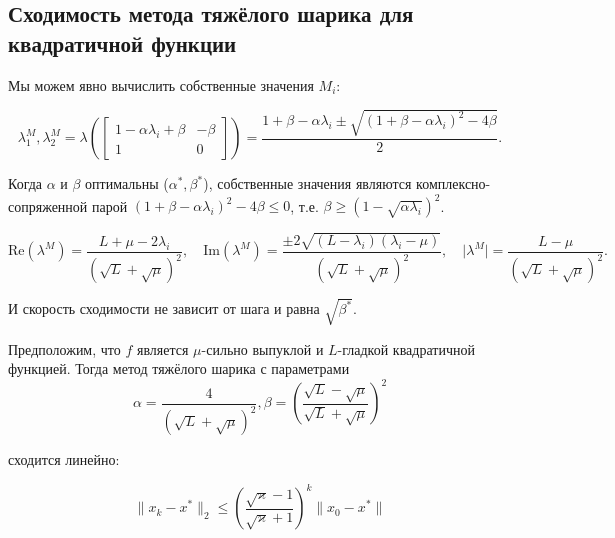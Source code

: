 \documentclass[
  russian,
  letterpaper,
  DIV=11,
  numbers=noendperiod]{scrartcl}
\begin{document}
\subsection{Сходимость метода тяжёлого шарика для квадратичной
функции}\label{ux441ux445ux43eux434ux438ux43cux43eux441ux442ux44c-ux43cux435ux442ux43eux434ux430-ux442ux44fux436ux451ux43bux43eux433ux43e-ux448ux430ux440ux438ux43aux430-ux434ux43bux44f-ux43aux432ux430ux434ux440ux430ux442ux438ux447ux43dux43eux439-ux444ux443ux43dux43aux446ux438ux438}

Мы можем явно вычислить собственные значения \(M_i\):

\[
\lambda^M_1, \lambda^M_2 = \lambda \left( \begin{bmatrix} 
1 - \alpha \lambda_i + \beta & -\beta \\
1 & 0
\end{bmatrix}\right) = \dfrac{1+\beta - \alpha \lambda_i \pm \sqrt{(1+\beta - \alpha\lambda_i)^2 - 4\beta}}{2}.
\]

Когда \(\alpha\) и \(\beta\) оптимальны (\(\alpha^*, \beta^*\)),
собственные значения являются комплексно-сопряженной парой
\((1+\beta - \alpha\lambda_i)^2 - 4\beta \leq 0\), т.е.
\(\beta \geq (1 - \sqrt{\alpha \lambda_i})^2\).

\[
\text{Re}(\lambda^M) = \dfrac{L + \mu - 2\lambda_i}{(\sqrt{L} + \sqrt{\mu})^2}, \quad \text{Im}(\lambda^M) = \dfrac{\pm 2\sqrt{(L - \lambda_i)(\lambda_i - \mu)}}{(\sqrt{L} + \sqrt{\mu})^2}, \quad \lvert \lambda^M \rvert = \dfrac{L - \mu}{(\sqrt{L} + \sqrt{\mu})^2}.
\]

И скорость сходимости не зависит от шага и равна \(\sqrt{\beta^*}\).

\begin{tcolorbox}[enhanced jigsaw, rightrule=.15mm, coltitle=black, title=\textcolor{quarto-callout-color}{\faInfo}\hspace{0.5em}{Theorem}, colbacktitle=quarto-callout-color!10!white, opacityback=0, colframe=quarto-callout-color-frame, bottomtitle=1mm, toptitle=1mm, titlerule=0mm, arc=.35mm, leftrule=.75mm, breakable, toprule=.15mm, bottomrule=.15mm, opacitybacktitle=0.6, left=2mm, colback=white]

Предположим, что \(f\) является \(\mu\)-сильно выпуклой и \(L\)-гладкой
квадратичной функцией. Тогда метод тяжёлого шарика с параметрами \[
\alpha = \dfrac{4}{(\sqrt{L} + \sqrt{\mu})^2}, \beta = \left(\dfrac{\sqrt{L} - \sqrt{\mu}}{\sqrt{L} + \sqrt{\mu}}\right)^2
\]

сходится линейно:

\[
\|x_k - x^*\|_2 \leq \left( \dfrac{\sqrt{\varkappa} - 1}{\sqrt{\varkappa} + 1} \right)^k \|x_0 - x^*\|
\]

\end{tcolorbox}
\end{document}
